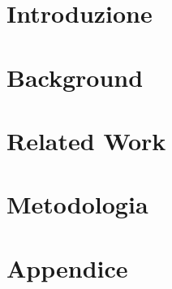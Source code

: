 \documentclass[14pt]{extreport}
\begin{document}




\chapter{Introduzione}
\setcounter{page}{1} 		


\chapter{Background}


\chapter{Related Work}


\chapter{Metodologia}









\chapter*{Appendice}
\setlength{\headheight}{17pt}
\rhead{}
\fancyhead[L]{\rightmark}
\cfoot{\thepage}



\listoffigures %
\listoftables %
\end{document}

